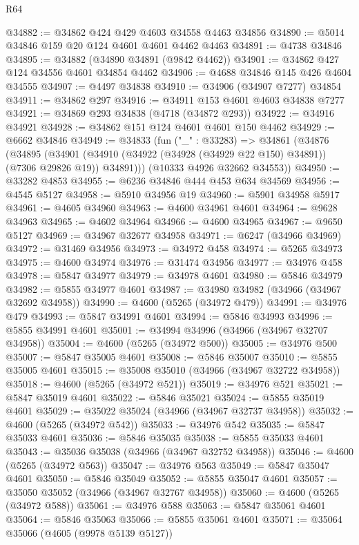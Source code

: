 \begin{lexlean}{R64}
\begin{coremodule}
@34882 := @34862 @424 @429 @4603 @34558 @4463 @34856
@34890 := @5014 @34846 @159 @20 @124 @4601 @4601 @4462 @4463
@34891 := @4738 @34846
@34895 := @34882 (@34890 @34891 (@9842 @4462))
@34901 := @34862 @427 @124 @34556 @4601 @34854 @4462
@34906 := @4688 @34846 @145 @426 @4604 @34555
@34907 := @4497 @34838
@34910 := @34906 (@34907 @7277) @34854
@34911 := @34862 @297
@34916 := @34911 @153 @4601 @4603 @34838 @7277
@34921 := @34869 @293 @34838 (@4718 (@34872 @293))
@34922 := @34916 @34921
@34928 := @34862 @151 @124 @4601 @4601 @150 @4462
@34929 := @6662 @34846
@34949 := @34833
    (fun ("_" : @33283) =>
    @34861
      (@34876
        (@34895
          (@34901 (@34910 (@34922 (@34928 (@34929 @22 @150) @34891)) (@7306 @29826 @19)) @34891)))
      (@10333 @4926 @32662 @34553))
@34950 := @33282 @4853
@34955 := @6236 @34846 @444 @453 @634 @34569
@34956 := @4545 @5127
@34958 := @5910 @34956 @19
@34960 := @5901 @34958 @5917
@34961 := @4605 @34960
@34963 := @4600 @34961 @4601
@34964 := @9628 @34963
@34965 := @4602 @34964
@34966 := @4600 @34965
@34967 := @9650 @5127
@34969 := @34967 @32677 @34958
@34971 := @6247 (@34966 @34969)
@34972 := @31469 @34956
@34973 := @34972 @458
@34974 := @5265 @34973
@34975 := @4600 @34974
@34976 := @31474 @34956
@34977 := @34976 @458
@34978 := @5847 @34977
@34979 := @34978 @4601
@34980 := @5846 @34979
@34982 := @5855 @34977 @4601
@34987 := @34980 @34982 (@34966 (@34967 @32692 @34958))
@34990 := @4600 (@5265 (@34972 @479))
@34991 := @34976 @479
@34993 := @5847 @34991 @4601
@34994 := @5846 @34993
@34996 := @5855 @34991 @4601
@35001 := @34994 @34996 (@34966 (@34967 @32707 @34958))
@35004 := @4600 (@5265 (@34972 @500))
@35005 := @34976 @500
@35007 := @5847 @35005 @4601
@35008 := @5846 @35007
@35010 := @5855 @35005 @4601
@35015 := @35008 @35010 (@34966 (@34967 @32722 @34958))
@35018 := @4600 (@5265 (@34972 @521))
@35019 := @34976 @521
@35021 := @5847 @35019 @4601
@35022 := @5846 @35021
@35024 := @5855 @35019 @4601
@35029 := @35022 @35024 (@34966 (@34967 @32737 @34958))
@35032 := @4600 (@5265 (@34972 @542))
@35033 := @34976 @542
@35035 := @5847 @35033 @4601
@35036 := @5846 @35035
@35038 := @5855 @35033 @4601
@35043 := @35036 @35038 (@34966 (@34967 @32752 @34958))
@35046 := @4600 (@5265 (@34972 @563))
@35047 := @34976 @563
@35049 := @5847 @35047 @4601
@35050 := @5846 @35049
@35052 := @5855 @35047 @4601
@35057 := @35050 @35052 (@34966 (@34967 @32767 @34958))
@35060 := @4600 (@5265 (@34972 @588))
@35061 := @34976 @588
@35063 := @5847 @35061 @4601
@35064 := @5846 @35063
@35066 := @5855 @35061 @4601
@35071 := @35064 @35066 (@4605 (@9978 @5139 @5127))

\end{coremodule}
\end{lexlean}
